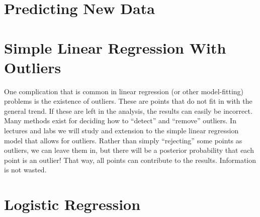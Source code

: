 \section{Predicting New Data}



\section{Simple Linear Regression With Outliers}
One complication that is common in linear regression (or other model-fitting)
problems is the existence of outliers. These are points that do not fit in with
the general trend. If these are left in the analysis, the results can easily
be incorrect. Many methods exist for deciding how to ``detect'' and ``remove''
outliers. In lectures and labs we will study and extension to the simple linear
regression model that allows for outliers. Rather than simply ``rejecting'' some
points as outliers, we can leave them in, but there will be a posterior probability
that each point is an outlier! That way, all points can contribute to the results.
Information is not wasted.

\section{Logistic Regression}

